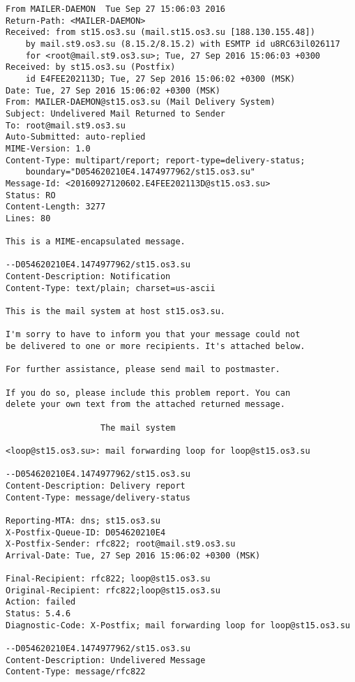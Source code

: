 \documentclass[10pt]{article}
\begin{document}
\begin{verbatim}
From MAILER-DAEMON  Tue Sep 27 15:06:03 2016
Return-Path: <MAILER-DAEMON>
Received: from st15.os3.su (mail.st15.os3.su [188.130.155.48])
    by mail.st9.os3.su (8.15.2/8.15.2) with ESMTP id u8RC63il026117
    for <root@mail.st9.os3.su>; Tue, 27 Sep 2016 15:06:03 +0300
Received: by st15.os3.su (Postfix)
    id E4FEE202113D; Tue, 27 Sep 2016 15:06:02 +0300 (MSK)
Date: Tue, 27 Sep 2016 15:06:02 +0300 (MSK)
From: MAILER-DAEMON@st15.os3.su (Mail Delivery System)
Subject: Undelivered Mail Returned to Sender
To: root@mail.st9.os3.su
Auto-Submitted: auto-replied
MIME-Version: 1.0
Content-Type: multipart/report; report-type=delivery-status;
    boundary="D054620210E4.1474977962/st15.os3.su"
Message-Id: <20160927120602.E4FEE202113D@st15.os3.su>
Status: RO
Content-Length: 3277
Lines: 80

This is a MIME-encapsulated message.

--D054620210E4.1474977962/st15.os3.su
Content-Description: Notification
Content-Type: text/plain; charset=us-ascii

This is the mail system at host st15.os3.su.

I'm sorry to have to inform you that your message could not
be delivered to one or more recipients. It's attached below.

For further assistance, please send mail to postmaster.

If you do so, please include this problem report. You can
delete your own text from the attached returned message.

                   The mail system

<loop@st15.os3.su>: mail forwarding loop for loop@st15.os3.su

--D054620210E4.1474977962/st15.os3.su
Content-Description: Delivery report
Content-Type: message/delivery-status

Reporting-MTA: dns; st15.os3.su
X-Postfix-Queue-ID: D054620210E4
X-Postfix-Sender: rfc822; root@mail.st9.os3.su
Arrival-Date: Tue, 27 Sep 2016 15:06:02 +0300 (MSK)

Final-Recipient: rfc822; loop@st15.os3.su
Original-Recipient: rfc822;loop@st15.os3.su
Action: failed
Status: 5.4.6
Diagnostic-Code: X-Postfix; mail forwarding loop for loop@st15.os3.su

--D054620210E4.1474977962/st15.os3.su
Content-Description: Undelivered Message
Content-Type: message/rfc822


\end{verbatim}
\end{document}
